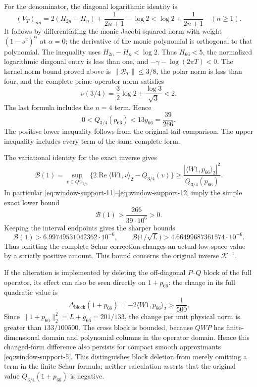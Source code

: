 For the denominator, the diagonal logarithmic identity is
\[
 (V_T)_{nn}=2(H_{2n}-H_n)+\frac1{2n+1}-\log2
 <\log2+\frac1{2n+1}\quad(n\ge1).
\]
It follows by differentiating the monic Jacobi squared norm
with weight $(1-s^2)^\alpha$ at $\alpha=0$; the derivative
of the monic polynomial is orthogonal to that polynomial.
The inequality uses $H_{2n}-H_n<\log2$. Thus $H_{66}<5$,
the normalized logarithmic diagonal entry is less than one, and
$-\gamma-\log(2\pi T)<0$.  The kernel norm bound proved above
is $\|\mathcal R_T\|\le3/8$, the polar norm is less
than four, and the complete prime-operator norm satisfies
\[
 \nu(3/4)=\frac32\log2+\frac{\log3}{\sqrt3}<2.
\]
The last formula includes the $n=4$ term.  Hence
\begin{equation}
 0<Q_{3/4}(p_{66})<13g_{66}=\frac{39}{266}.
 \label{eq:window-support-12}
\end{equation}
The positive lower inequality follows from the original tail
comparison.  The upper inequality includes every term of the
same complete form.

The variational identity for the exact inverse gives
\[
 \mathcal B(1)
 =\sup_{v\in Q\mathcal Q_{3/4}}
    \{2\operatorname{Re}\langle W1,v\rangle_2-Q_{3/4}(v)\}
 \ge\frac{|\langle W1,p_{66}\rangle_2|^2}{Q_{3/4}(p_{66})}.
\]
In particular \eqref{eq:window-support-11}--\eqref{eq:window-support-12} imply the simple exact lower bound
\[
 \mathcal B(1)>\frac{266}{39\cdot10^6}>0.
\]
Keeping the interval endpoints gives the sharper bounds
\begin{equation}
 \mathcal B(1)>6.99749531042362\cdot10^{-6},\qquad
 \mathcal B\bigl(1/\sqrt L\bigr)
       >4.66499687361574\cdot10^{-6}.
 \label{eq:window-support-13}
\end{equation}
Thus omitting the complete Schur correction changes an actual
low-space value by a strictly positive amount.  This bound concerns the original inverse $\mathcal K^{-1}$.

If the alteration is implemented by deleting the off-diagonal
$P$--$Q$ block of the full operator, its effect can also be
seen directly on $1+p_{66}$: the change in its full quadratic
value is
\[
 \Delta_{\mathrm{block}}(1+p_{66})
 =-2\langle W1,p_{66}\rangle_2>\frac1{500}.
\]
Since $\|1+p_{66}\|_2^2=L+g_{66}=201/133$, the change per
unit physical norm is greater than $133/100500$.
The cross block is bounded, because $QWP$ has finite-dimensional
domain and polynomial columns in the operator domain.  Hence
this changed-form difference also persists for compact smooth
approximants \eqref{eq:window-support-5}.  This distinguishes block deletion from
merely omitting a term in the finite Schur formula; neither
calculation asserts that the original value $Q_{3/4}(1+p_{66})$ is negative.

